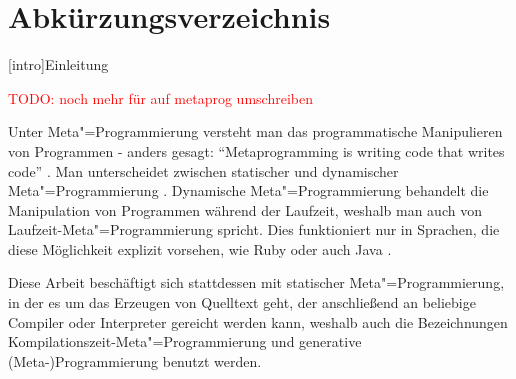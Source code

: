 \documentclass[11pt, a4paper, bibgerm]{scrbook}
\newcommand{\todo}[1]{
  \textcolor{red}{TODO: #1}
}
\newcommand\lchapter{}
\newcommand{\mprog}{Meta"=Programmierung}
\begin{document}
\cleardoublepage


\tableofcontents

\chapter*{Abkürzungsverzeichnis}
\begin{acronym}
\end{acronym}



\lchapter[intro]{Einleitung}


\todo{noch mehr für auf metaprog umschreiben}

Unter \mprog{} versteht man das programmatische Manipulieren von
Programmen - anders gesagt: ``Metaprogramming is writing code that
writes code'' \cite[S.16]{metaprog-ruby}. Man unterscheidet zwischen
statischer und dynamischer
\mprog{} \cite[S.17]{metaprog-ruby}. Dynamische \mprog{} behandelt die
Manipulation von Programmen während der Laufzeit, weshalb man auch von
Laufzeit-\mprog{} spricht. Dies funktioniert nur in Sprachen, die diese
Möglichkeit explizit vorsehen, wie Ruby \cite{metaprog-ruby} oder auch
Java \cite{JavaReflection}.

Diese Arbeit beschäftigt sich stattdessen mit statischer
\mprog{}, in der es um das Erzeugen von Quelltext geht, der anschließend
an beliebige Compiler oder Interpreter gereicht werden kann, weshalb 
auch die Bezeichnungen Kompilationszeit-\mprog{} und generative
(Meta-)Programmierung \cite[S.17]{metaprog-sh} benutzt werden.
\end{document}
